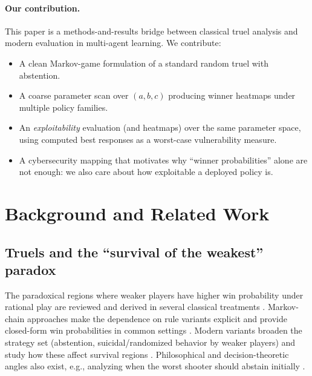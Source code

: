 \documentclass[11pt]{article}
\begin{document}
\paragraph{Our contribution.}
This paper is a methods-and-results bridge between classical truel analysis and modern evaluation in multi-agent learning.
We contribute:
\begin{itemize}
  \item A clean Markov-game formulation of a standard random truel with abstention.
  \item A coarse parameter scan over $(a,b,c)$ producing winner heatmaps under multiple policy families.
  \item An \emph{exploitability} evaluation (and heatmaps) over the same parameter space, using computed best responses as a worst-case vulnerability measure.
  \item A cybersecurity mapping that motivates why ``winner probabilities'' alone are not enough: we also care about how exploitable a deployed policy is.
\end{itemize}

\section{Background and Related Work}

\subsection{Truels and the ``survival of the weakest'' paradox}
The paradoxical regions where weaker players have higher win probability under rational play are reviewed and derived in several classical treatments \citep{BramsKilgour1997,AmengualToral2006}.
Markov-chain approaches make the dependence on rule variants explicit and provide closed-form win probabilities in common settings \citep{ToralAmengual2005,AmengualToral2006}.
Modern variants broaden the strategy set (abstention, suicidal/randomized behavior by weaker players) and study how these affect survival regions \citep{DorrakiAllisonAbbott2019}.
Philosophical and decision-theoretic angles also exist, e.g., analyzing when the worst shooter should abstain initially \citep{Xu2012}.
\end{document}
